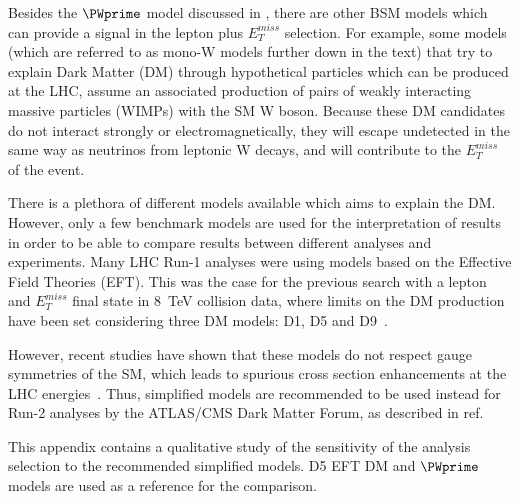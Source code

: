 Besides the $\PWprime$ model discussed in , there are other BSM models 
which can provide a signal in the lepton plus $E_{T}^{miss}$ selection.
For example, some models (which are referred to as mono-W models further down in the text) that try to explain Dark Matter (DM) through hypothetical particles which can be produced at the LHC, assume an associated production of pairs of weakly interacting massive particles (WIMPs) with the SM W boson.
Because these DM candidates do not interact strongly or electromagnetically, they will escape undetected in the same way as neutrinos from leptonic W decays, and will contribute to the $E_{T}^{miss}$ of the event.

There is a plethora of different models available which aims to explain the DM.
However, only a few benchmark models are used for the interpretation of results in order to be able to compare results between different analyses and experiments.
Many LHC Run-1 analyses were using models based on the Effective Field Theories (EFT). 
This was the case for the previous search with a lepton and $E_T^{miss}$ final state in 8~TeV collision data, where limits on the DM production have been set considering three DM models: D1, D5 and D9~\cite{wprime_8TeV}. 

However, recent studies have shown that these models do not respect gauge symmetries of the SM, which leads to spurious cross section enhancements at the LHC energies~\cite{arXiv:1503.07874}.
Thus, simplified models are recommended to be used instead for Run-2 analyses
by the ATLAS/CMS Dark Matter Forum, as described in ref.~\cite{DM_forum_2015}

This appendix contains a qualitative study of the sensitivity of the analysis selection
to the recommended simplified models. D5 EFT DM and $\PWprime$ models are used as a reference for the comparison.



